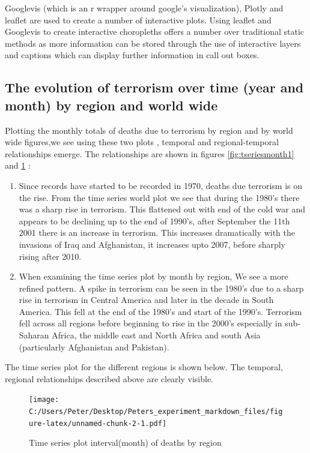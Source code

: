 Googlevis (which is an r wrapper around google's visualization), Plotly \citep{plotlymanual2016} and leaflet \citep{leaflet2016} are used to create a number of interactive plots. Using leaflet and Googlevis to create interactive choropleths offers a number over traditional static methods as more information can be stored through the  use of interactive layers and captions which can display further information in call out boxes. 

\subsection{The evolution of terrorism over time (year and month) by
region and world wide}\label{sec:evteryearmonth}

Plotting the monthly totals of deaths due to terrorism by region and by
world wide figures,we see using these two plots , temporal and
regional-temporal relationships emerge. The relationships are shown in figures \ref{fig:tseriesmonth1} and \ref{fig:tseriesmonthregion1}
:

\begin{enumerate}
\item
  Since records have started to be recorded in 1970, deaths due
  terrorism is on the rise. From the time series world plot we see that
  during the 1980's there was a sharp rise in terrorism. This flattened
  out with end of the cold war and appears to be declining up to the end
  of 1990's, after September the 11th 2001 there is an increase in
  terrorism. This increases dramatically with the invasions of Iraq and
  Afghanistan, it increases upto 2007, before sharply rising after 2010.
\item
  When examining the time series plot by month by region, We see a more
  refined pattern. A spike in terrorism can be seen in the 1980's due
  to a sharp rise in terrorism in Central America and later in the
  decade in South America. This fell at the end of the 1980's and start
  of the 1990's. Terrorism fell across all regions before beginning to
  rise in the 2000's especially in sub-Saharan Africa, the middle east
  and North Africa and south Asia (particularly Afghanistan and
  Pakistan).
\end{enumerate}

The time series plot for the different regions is shown below. The
temporal, regional relationships described above are clearly visible.

\begin{figure}[t]
\texttt{[image: C:/Users/Peter/Desktop/Peters\_experiment\_markdown\_files/figure-latex/unnamed-chunk-2-1.pdf]}
\caption{Time series plot interval(month) of deaths by region}
\label{fig:tseriesmonthregion1}
\centering
\end{figure}

